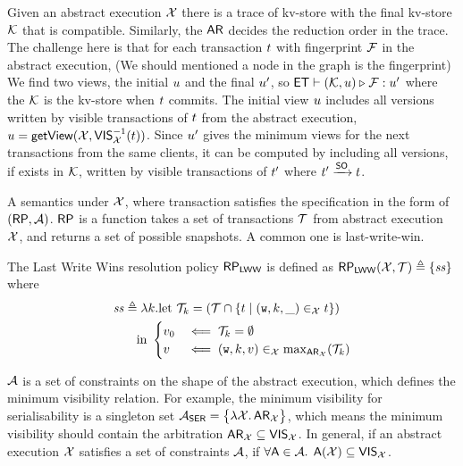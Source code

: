 Given an abstract execution \( \mathcal{X} \) there is a trace of kv-store with the final kv-store \( \mathcal{K} \) that is compatible.
Similarly, the \( \mathsf{AR} \) decides the reduction order in the trace.
The challenge here is that
for each transaction \( t \) with fingerprint \( \mathcal{F} \) in the abstract execution,
(We should mentioned a node in the graph is the fingerprint)
We find two views, the initial \( u \) and the final \( u' \), so \( \mathsf{ET} \vdash (\mathcal{K}, u) \triangleright_{} \mathcal{F} : u' \) where the \( \mathcal{K} \) is the kv-store when \( t \) commits.
The initial view \( u \) includes all versions written by visible transactions of \( t \) from the abstract execution, \ie \( u = \mathsf{getView}(\mathcal{X}, \mathsf{VIS}_{\mathcal{X}}^{-1}(t)) \).
Since \( u' \) gives the minimum views for the next transactions from the same clients,
it can be computed by including all versions, if exists in \( \mathcal{K} \), written by visible transactions of \( t' \) where \( t' \xrightarrow{\mathsf{SO}} t \).


A semantics under \( \mathcal{X} \), where transaction satisfies the specification in the form of \( (\mathsf{RP},\mathcal{A}) \).
\( \mathsf{RP} \) is a function takes a set of transactions \( \mathcal{T} \) from abstract execution \( \mathcal{X} \), 
and returns  a set of possible snapshots.
A common one is last-write-win.

\begin{definition}
\label{def:lww}
The Last Write Wins resolution policy $\mathsf{RP}_{\mathsf{LWW}}$ is defined as 
$\mathsf{RP}_{\mathsf{LWW}}(\mathcal{X}, \mathcal{T}) \triangleq \{\mathit{ss}\}$ where
\begin{align*}
    \mathit{ss} & \triangleq \lambda k. \text{let} \ \mathcal{T}_{k} = ( \mathcal{T} \cap \{t \mid (\textnormal{\texttt w},k, \_) \in_{\mathcal{X}} t\}) \\
       & \quad \text{in} \
\begin{cases}
v_{0} &\impliedby \mathcal{T}_{k} =  \emptyset\\
v &\impliedby (\textnormal{\texttt w}, k, v) \in_{\mathcal{X}} \max_{\mathsf{AR}_{\mathcal{X}}}(\mathcal{T}_{k})
\end{cases}
\end{align*}
\end{definition}

\( \mathcal{A} \) is a set of constraints on the shape of the abstract execution,
which defines the minimum visibility relation.
For example, the minimum visibility for serialisability is a singleton set
\( \Ax_\SER = \Set{\lambda \aexec \ldotp \AR_\aexec } \),
which means the minimum visibility should contain the arbitration \( \mathsf{AR}_{\mathcal{X}} \subseteq \mathsf{VIS}_{\mathcal{X}} \).
In general, if an abstract execution \( \mathcal{X} \) satisfies a set of constraints  \( \mathcal{A} \),
if \( \forall \mathsf{A} \in \mathcal{A} \ldotp \; \mathsf{A}(\mathcal{X}) \subseteq \mathsf{VIS}_{\mathcal{X}} \).

